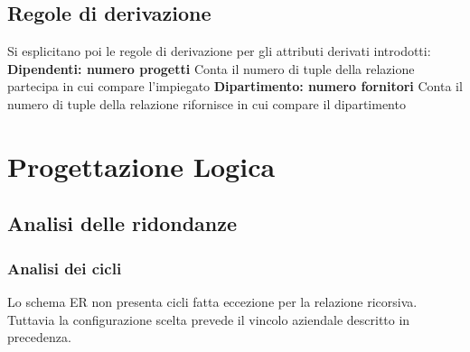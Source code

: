 \documentclass{article}
\begin{document}
\subsection{Regole di derivazione}
Si esplicitano poi le regole di derivazione per gli attributi derivati introdotti:
\newline
\newline
\textbf{Dipendenti: numero progetti}
\newline
Conta il numero di tuple della relazione partecipa in cui compare l'impiegato
\newline
\newline
\textbf{Dipartimento: numero fornitori}
\newline
Conta il numero di tuple della relazione rifornisce in cui compare il dipartimento

\newpage

\section{Progettazione Logica}

\subsection{Analisi delle ridondanze}

\subsubsection{Analisi dei cicli}
Lo schema ER non presenta cicli fatta eccezione per la relazione ricorsiva.
\newline
Tuttavia la configurazione scelta prevede il vincolo aziendale descritto in precedenza.
\end{document}
